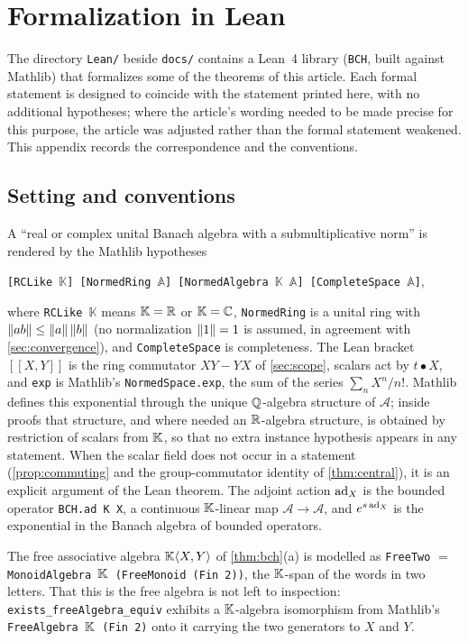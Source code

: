 \section{Formalization in Lean}\label{app:lean}
The directory \texttt{Lean/} beside \texttt{docs/} contains a Lean~4 library
(\texttt{BCH}, built against Mathlib) that formalizes some of the theorems
of this article. Each formal statement is designed to coincide with the
statement printed here, with no additional hypotheses; where the article's
wording needed to be made precise for this purpose, the article was
adjusted rather than the formal statement weakened. This appendix records
the correspondence and the conventions.

\subsection*{Setting and conventions}
A ``real or complex unital Banach algebra with a submultiplicative norm''
is rendered by the Mathlib hypotheses
\begin{center}
\texttt{[RCLike $\mathbb K$] [NormedRing $\mathbb A$]
[NormedAlgebra $\mathbb K$ $\mathbb A$] [CompleteSpace $\mathbb A$]},
\end{center}
where \texttt{RCLike $\mathbb K$} means $\mathbb{K}=\mathbb{R}$ or $\mathbb{K}=\mathbb{C}$,
\texttt{NormedRing} is a unital ring with $\left\lVert ab\right\rVert\leq\left\lVert a\right\rVert\left\lVert b\right\rVert$ (no
normalization $\left\lVert1\right\rVert=1$ is assumed, in agreement with
\cref{sec:convergence}), and \texttt{CompleteSpace} is completeness. The
Lean bracket $[\![X,Y]\!]$ is the ring commutator $XY-YX$ of
\cref{sec:scope}, scalars act by $t\bullet X$, and \texttt{exp} is
Mathlib's \texttt{NormedSpace.exp}, the sum of the series $\sum_nX^n/n!$.
Mathlib defines this exponential through the unique $\mathbb{Q}$-algebra structure
of $\mathcal A$; inside proofs that structure, and where needed an
$\mathbb{R}$-algebra structure, is obtained by restriction of scalars from $\mathbb{K}$,
so that no extra instance hypothesis appears in any statement. When the
scalar field does not occur in a statement (\cref{prop:commuting} and the
group-commutator identity of \cref{thm:central}), it is an explicit
argument of the Lean theorem. The adjoint action $\operatorname{ad}_X$ is the bounded
operator \texttt{BCH.ad K X}, a continuous $\mathbb{K}$-linear map
$\mathcal A\to\mathcal A$, and $e^{s\operatorname{ad}_X}$ is the exponential in the
Banach algebra of bounded operators.

The free associative algebra $\mathbb{K}\langle X,Y\rangle$ of \cref{thm:bch}(a) is
modelled as \texttt{FreeTwo} $=$ \texttt{MonoidAlgebra $\mathbb{K}$ (FreeMonoid
(Fin 2))}, the $\mathbb{K}$-span of the words in two letters. That this is the free
algebra is not left to inspection: \texttt{exists\_freeAlgebra\_equiv}
exhibits a $\mathbb{K}$-algebra isomorphism from Mathlib's \texttt{FreeAlgebra
$\mathbb{K}$ (Fin 2)} onto it carrying the two generators to $X$ and $Y$.

